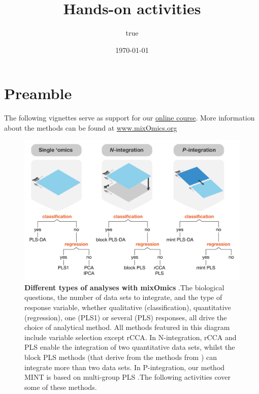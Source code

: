 \documentclass[]{book}
\title{Hands-on activities}
\author{true}
\date{\today}
\begin{document}
\maketitle

{
\setcounter{tocdepth}{1}
\tableofcontents
}
\chapter*{Preamble}\label{preamble}

The following vignettes serve as support for our
\href{https://study.unimelb.edu.au/find/short-courses/mixomics-r-essentials-for-biological-data-integration/\#course-specifics}{online
course}. More information about the methods can be found at
\url{www.mixOmics.org}

\begin{figure}
\centering
\includegraphics{XtraFigs/MixOmicsAnalysesV2.pdf}
\caption{\label{fig:methods-fig}\textbf{Different types of analyses with
mixOmics} \citep{mixomics}.The biological questions, the number of data
sets to integrate, and the type of response variable, whether
qualitative (classification), quantitative (regression), one (PLS1) or
several (PLS) responses, all drive the choice of analytical method. All
methods featured in this diagram include variable selection except rCCA.
In N-integration, rCCA and PLS enable the integration of two
quantitative data sets, whilst the block PLS methods (that derive from
the methods from \citet{Ten11}) can integrate more than two data sets.
In P-integration, our method MINT is based on multi-group PLS
\citep{Esl14b}.The following activities cover some of these methods.}
\end{figure}
\end{document}

